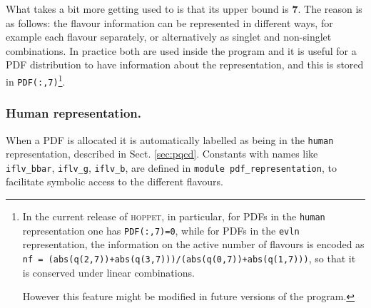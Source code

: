 \documentclass[12pt]{article}
\newcommand{\hoppet}{\textsc{hoppet}\xspace}
\newcommand{\ttt}[1]{\texttt{#1}}
\begin{document}
What takes a bit more getting used to is that its
upper bound is \textbf{7}. The reason is as follows: the flavour
information can be represented in different ways, for example each
flavour separately, or alternatively as singlet and non-singlet
combinations. In practice both are used inside the program and it is
useful for a PDF distribution to have information about the
representation, and this is stored in
\texttt{PDF(:,7)}\footnote{
In the current release of \hoppet, 
in particular, for PDFs in the \ttt{human} representation one
has \texttt{PDF(:,7)=0}, while for PDFs in the \ttt{evln}
representation, the information on the active number of flavours
is encoded as
\ttt{nf = (abs(q(2,7))+abs(q(3,7)))/(abs(q(0,7))+abs(q(1,7)))},
so that it is conserved under linear combinations.

However this feature might be modified in future
versions of the program.
}.


\subsubsection{Human representation.}
\label{sec:human-rep}
When a PDF is allocated it is automatically labelled as being in the
\ttt{human} representation, described in
Sect. \ref{sec:pqcd}. Constants with names like
\ttt{iflv\_bbar}, \ttt{iflv\_g}, \ttt{iflv\_b}, are defined in
\ttt{module pdf\_representation}, to facilitate symbolic access to the
different flavours.
\end{document}
